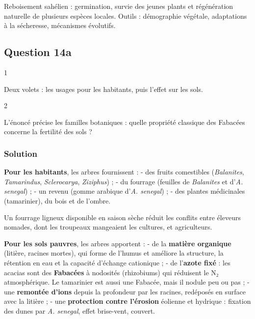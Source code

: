 \documentclass[11pt,a4paper]{article}
\begin{document}
Reboisement sahélien : germination, survie des jeunes plants et régénération naturelle de plusieurs espèces locales. Outils : démographie végétale, adaptations à la sécheresse, mécanismes évolutifs.

\hypertarget{question-14a}{%
\subsection{Question 14a}\label{question-14a}}

\begin{indication}{1}

Deux volets : les usages pour les habitants, puis l'effet sur les sols.

\end{indication}

\begin{indication}{2}

L'énoncé précise les familles botaniques : quelle propriété classique des Fabacées concerne la fertilité des sols ?

\end{indication}

\hypertarget{solution-37}{%
\subsubsection{Solution}\label{solution-37}}

\textbf{Pour les habitants}, les arbres fournissent :
- des fruits comestibles (\emph{Balanites}, \emph{Tamarindus}, \emph{Sclerocarya}, \emph{Ziziphus}) ;
- du fourrage (feuilles de \emph{Balanites} et d'\emph{A. senegal}) ;
- un revenu (gomme arabique d'\emph{A. senegal}) ;
- des plantes médicinales (tamarinier), du bois et de l'ombre.

Un fourrage ligneux disponible en saison sèche réduit les conflits entre éleveurs nomades, dont les troupeaux mangeaient les cultures, et agriculteurs.

\textbf{Pour les sols pauvres}, les arbres apportent :
- de la \textbf{matière organique} (litière, racines mortes), qui forme de l'humus et améliore la structure, la rétention en eau et la capacité d'échange cationique ;
- de l'\textbf{azote fixé} : les acacias sont des \textbf{Fabacées} à nodosités (rhizobiums) qui réduisent le N₂ atmosphérique. Le tamarinier est aussi une Fabacée, mais il nodule peu ou pas ;
- une \textbf{remontée d'ions} depuis la profondeur par les racines, redéposés en surface avec la litière ;
- une \textbf{protection contre l'érosion} éolienne et hydrique : fixation des dunes par \emph{A. senegal}, effet brise-vent, couvert.
\end{document}
